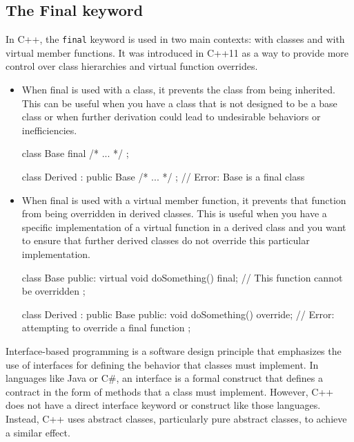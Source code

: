 \documentclass{report}
\begin{document}
\begin{concept}
    \pagebreak
    \subsection{The Final keyword}
    \bigbreak \noindent 
    \begin{concept}
        In C++, the \texttt{final} keyword is used in two main contexts: with classes and with virtual member functions. It was introduced in C++11 as a way to provide more control over class hierarchies and virtual function overrides.
        \begin{itemize}
            \item When final is used with a class, it prevents the class from being inherited. This can be useful when you have a class that is not designed to be a base class or when further derivation could lead to undesirable behaviors or inefficiencies.
                \bigbreak \noindent 
                \begin{cppcode}
                class Base final { /* ... */ };

                class Derived : public Base { /* ... */ }; // Error: Base is a final class
                \end{cppcode}
            \item When final is used with a virtual member function, it prevents that function from being overridden in derived classes. This is useful when you have a specific implementation of a virtual function in a derived class and you want to ensure that further derived classes do not override this particular implementation.
                \bigbreak \noindent 
                \begin{cppcode}
                class Base {
                public:
                    virtual void doSomething() final; // This function cannot be overridden
                };

                class Derived : public Base {
                public:
                    void doSomething() override; // Error: attempting to override a final function
                };
                \end{cppcode}
        \end{itemize}
    \end{concept}


    \pagebreak
    \bigbreak \noindent 
    \begin{concept}
        Interface-based programming is a software design principle that emphasizes the use of interfaces for defining the behavior that classes must implement. In languages like Java or C\#, an interface is a formal construct that defines a contract in the form of methods that a class must implement. However, C++ does not have a direct interface keyword or construct like those languages. Instead, C++ uses abstract classes, particularly pure abstract classes, to achieve a similar effect. 
    \end{concept}


\end{concept}
\end{document}
